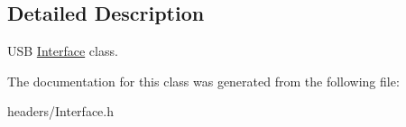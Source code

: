 \subsection{Detailed Description}
U\-S\-B \hyperlink{class_lib_u_s_b_1_1_interface}{Interface} class. 

The documentation for this class was generated from the following file\-:\begin{DoxyCompactItemize}
\item 
headers/Interface.\-h\end{DoxyCompactItemize}
